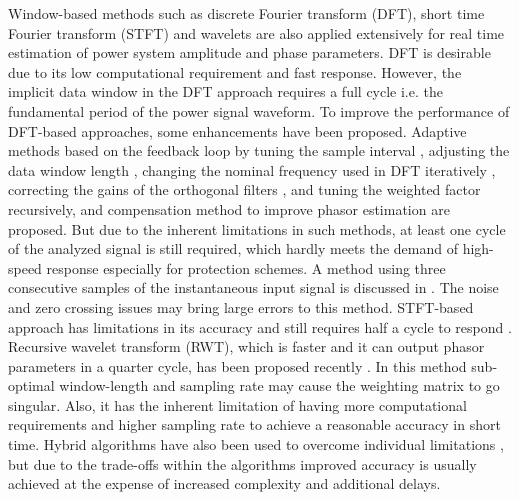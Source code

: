 \documentclass{UCF_ETD}
\begin{document}
Window-based methods such as discrete Fourier transform (DFT), short time Fourier transform (STFT) and wavelets are also applied extensively for real time estimation of power system amplitude and phase parameters. DFT is desirable due to its low computational requirement and fast response. However, the implicit data window in the DFT approach requires a full cycle i.e. the fundamental period of the power signal waveform. To improve the performance of DFT-based approaches, some enhancements have been proposed. Adaptive methods based on the feedback loop by tuning the sample interval \cite{Benmouyal1989}, adjusting the data window length \cite{Hart1997}, changing the nominal frequency used in DFT iteratively \cite{Sidhu1998}, correcting the gains of the orthogonal filters \cite{Moore1996}, and tuning the weighted factor \cite{Kusljevic2010} recursively, and compensation method to improve phasor estimation \cite{Wang2006} are proposed. But due to the inherent limitations in such methods, at least one cycle of the analyzed signal is still required, which hardly meets the demand of high-speed response especially for protection schemes. A method using three consecutive samples of the instantaneous input signal is discussed in \cite{Lopez2008}. The noise and zero crossing issues may bring large errors to this method. STFT-based approach has limitations in its accuracy and still requires half a cycle to respond \cite{Mai2010}. Recursive wavelet transform (RWT), which is faster and it can output phasor parameters in a quarter cycle, has been proposed recently \cite{Ren2011}. In this method sub-optimal window-length and sampling rate may cause the weighting matrix to go singular. Also, it has the inherent limitation of having more computational requirements and higher sampling rate to achieve a reasonable accuracy in short time. Hybrid algorithms have also been used to overcome individual limitations \cite{Sadinezhad2009}, but due to the trade-offs within the algorithms improved accuracy is usually achieved at the expense of increased complexity and additional delays.
\end{document}
